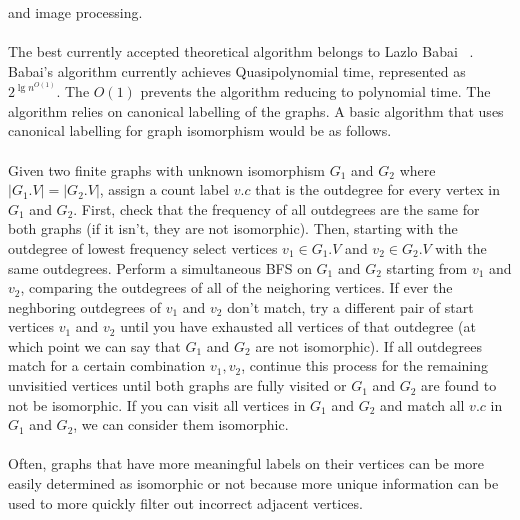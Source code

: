 \documentclass[letterpaper, 11pt]{article}
\begin{document}
    and image processing.
    \\\\
    The best currently accepted theoretical algorithm belongs to Lazlo Babai ~\cite{DBLP:journals/corr/Babai15}.
    Babai's algorithm currently achieves Quasipolynomial time, represented as $2^{\lg{n}^{O(1)}}$. The $O(1)$ prevents
    the algorithm reducing to polynomial time.
    The algorithm relies on canonical labelling of the graphs. A basic algorithm that uses canonical
    labelling for graph isomorphism would be as follows.\\\\
    Given two finite graphs with unknown isomorphism $G_1$ and $G_2$ where $|G_1.V| = |G_2.V|$, assign a count label $v.c$
    that is the outdegree for every vertex in $G_1$ and $G_2$. First, check that the frequency of all
    outdegrees are the same for both graphs (if it isn't, they are not isomorphic). Then,
    starting with the outdegree of lowest frequency
    select vertices $v_1 \in G_1.V$ and $v_2 \in G_2.V$ with the same outdegrees.
    Perform a simultaneous BFS on $G_1$ and $G_2$ starting from $v_1$ and $v_2$, comparing the
    outdegrees of all of the neighoring vertices. If ever the neghboring outdegrees of $v_1$ and $v_2$ don't match, try a different pair
    of start vertices $v_1$ and $v_2$ until you have exhausted all vertices of that outdegree (at which point we
    can say that $G_1$ and $G_2$ are not isomorphic). If all outdegrees match for a certain combination $v_1, v_2$, continue this process
    for the remaining unvisitied vertices until both graphs are fully visited or $G_1$ and $G_2$ are
    found to not be isomorphic. If you can visit all vertices in $G_1$ and $G_2$ and match all $v.c$ in $G_1$
    and $G_2$, we can consider them isomorphic.
    \\\\ Often, graphs that have more meaningful labels on their vertices
    can be more easily determined as isomorphic or not because more unique information can be used to
    more quickly filter out incorrect adjacent vertices.


\pagebreak
{}

\end{document}
